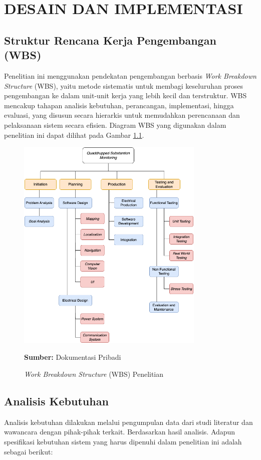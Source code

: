 \chapter{DESAIN DAN IMPLEMENTASI}
\label{chap:desainimplementasi}


\section{Struktur Rencana Kerja Pengembangan (WBS)}
\sloppy
Penelitian ini menggunakan pendekatan pengembangan berbasis \emph{Work Breakdown Structure} (WBS), yaitu metode sistematis untuk membagi keseluruhan proses pengembangan ke dalam unit-unit kerja yang lebih kecil dan terstruktur. WBS mencakup tahapan analisis kebutuhan, perancangan, implementasi, hingga evaluasi, yang disusun secara hierarkis untuk memudahkan perencanaan dan pelaksanaan sistem secara efisien. Diagram WBS yang digunakan dalam penelitian ini dapat dilihat pada Gambar \ref{fig:wbs}.

\begin{figure}[H]
  \centering
  \includegraphics[width=0.8\textwidth]{gambar/bab3/wbs.png}
  \caption{\emph{Work Breakdown Structure} (WBS) Penelitian}
  \label{fig:wbs}
  \footnotesize{\textbf{Sumber:} Dokumentasi Pribadi}
\end{figure}

\section{Analisis Kebutuhan}
Analisis kebutuhan dilakukan melalui pengumpulan data dari studi literatur dan wawancara dengan pihak-pihak terkait. Berdasarkan hasil analisis. Adapun spesifikasi kebutuhan sistem yang harus dipenuhi dalam penelitian ini adalah sebagai berikut:

